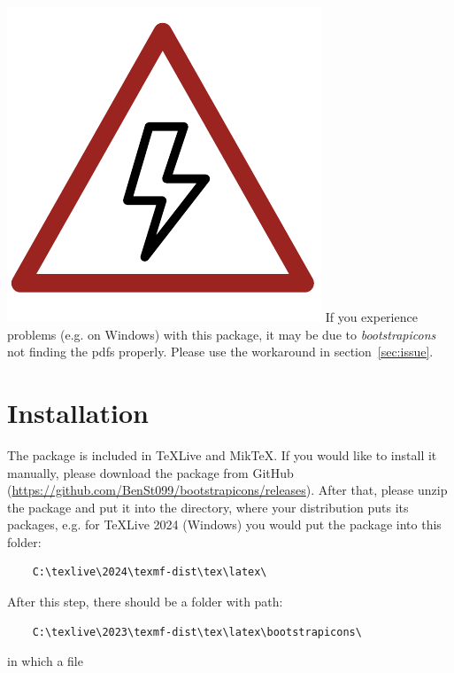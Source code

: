 \documentclass{article}
\begin{document}
\begin{tcolorbox}[leftrule=3mm,colback=red-200,colframe=red-800,lower separated=false,sidebyside,lefthand width=1.5cm]
    \includegraphics[scale=0.25]{danger.pdf}\tcblower {\bf\textcolor{red-800}{ATTENTION!}} If you experience problems (e.g. on Windows) with this package, it may be due to \textit{bootstrapicons} not finding the pdfs properly. Please use the workaround in section~\ref{sec:issue}.
\end{tcolorbox}\vspace{10mm}

\newpage

\section{Installation}

The package is included in \TeX Live and Mik\TeX. If you would like to install it manually, please download the package from GitHub (\href{https://github.com/BenSt099/bootstrapicons/releases}{\textcolor{blue-700}{https://github.com/BenSt099/bootstrapicons/releases}}).
After that, please unzip the package and put it into the directory, where your distribution puts its packages, e.g. for \TeX Live 2024 (Windows) you would put the package into this folder:

\begin{verbatim}
    C:\texlive\2024\texmf-dist\tex\latex\
\end{verbatim}

\noindent After this step, there should be a folder with path: 

\begin{verbatim}
    C:\texlive\2023\texmf-dist\tex\latex\bootstrapicons\
\end{verbatim}
in which a file 
\end{document}
